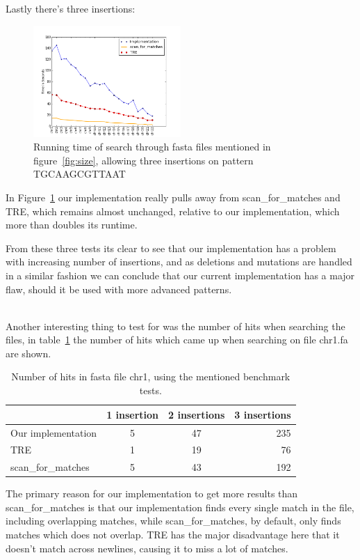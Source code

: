 Lastly there's three insertions:
\begin{figure}[h!]
\centering
\includegraphics[width=0.5\textwidth]{Benchmarking/3ins.png}
\caption{Running time of search through fasta files mentioned in figure~\ref{fig:size},  allowing three insertions on pattern TGCAAGCGTTAAT}
\label{fig:ins3}
\end{figure}

In Figure~\ref{fig:ins3} our implementation really pulls away from scan\_for\_matches and TRE, which remains almost unchanged, relative to our implementation, which more than doubles its runtime.


From these three tests its clear to see that our implementation has a problem with increasing number of insertions, and as deletions and mutations are handled in a similar fashion we can conclude that our current implementation has a major flaw, should it be used with more advanced patterns. 
\\
~

Another interesting thing to test for was the number of hits when searching the files, in table~\ref{tab:hits} the number of hits which came up when searching on file chr1.fa are shown.

\begin{table}[h!]
\centering
\begin{tabular}{ l | c c r }
& 1 insertion & 2 insertions & 3 insertions\\
\hline
Our implementation& 5 &  47 & 235 \\
TRE& 1 & 19 & 76 \\
scan\_for\_matches & 5 & 43  & 192 \\
\end{tabular}
\caption{Number of hits in fasta file chr1, using the mentioned benchmark tests.}
\label{tab:hits}
\end{table}

The primary reason for our implementation to get more results than scan\_for\_matches is that our implementation finds every single match in the file, including overlapping matches, while scan\_for\_matches, by default, only finds matches which does not overlap. TRE has the major disadvantage here that it doesn't match across newlines, causing it to miss a lot of matches.

